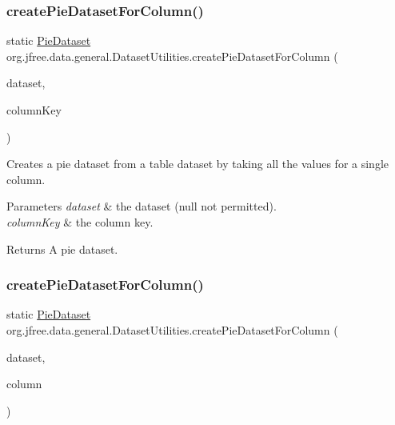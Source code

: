 \subsubsection{\texorpdfstring{create\+Pie\+Dataset\+For\+Column()}{createPieDatasetForColumn()}\hspace{0.1cm}{\footnotesize\ttfamily [1/2]}}
{\footnotesize\ttfamily static \mbox{\hyperlink{interfaceorg_1_1jfree_1_1data_1_1general_1_1_pie_dataset}{Pie\+Dataset}} org.\+jfree.\+data.\+general.\+Dataset\+Utilities.\+create\+Pie\+Dataset\+For\+Column (\begin{DoxyParamCaption}\item[{\mbox{\hyperlink{interfaceorg_1_1jfree_1_1data_1_1category_1_1_category_dataset}{Category\+Dataset}}}]{dataset,  }\item[{Comparable}]{column\+Key }\end{DoxyParamCaption})\hspace{0.3cm}{\ttfamily [static]}}

Creates a pie dataset from a table dataset by taking all the values for a single column.


\begin{DoxyParams}{Parameters}
{\em dataset} & the dataset ({\ttfamily null} not permitted). \\
\hline
{\em column\+Key} & the column key.\\
\hline
\end{DoxyParams}
\begin{DoxyReturn}{Returns}
A pie dataset. 
\end{DoxyReturn}
\mbox{\label{classorg_1_1jfree_1_1data_1_1general_1_1_dataset_utilities_ab0f4908d86f2df20cb8d0ac047421dc7}} 
\subsubsection{\texorpdfstring{create\+Pie\+Dataset\+For\+Column()}{createPieDatasetForColumn()}\hspace{0.1cm}{\footnotesize\ttfamily [2/2]}}
{\footnotesize\ttfamily static \mbox{\hyperlink{interfaceorg_1_1jfree_1_1data_1_1general_1_1_pie_dataset}{Pie\+Dataset}} org.\+jfree.\+data.\+general.\+Dataset\+Utilities.\+create\+Pie\+Dataset\+For\+Column (\begin{DoxyParamCaption}\item[{\mbox{\hyperlink{interfaceorg_1_1jfree_1_1data_1_1category_1_1_category_dataset}{Category\+Dataset}}}]{dataset,  }\item[{int}]{column }\end{DoxyParamCaption})\hspace{0.3cm}{\ttfamily [static]}}

